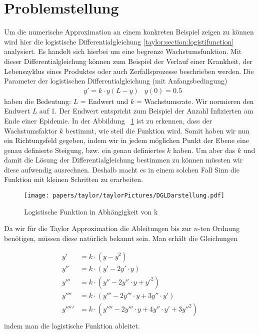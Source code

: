 %
%
%
\section{Problemstellung
\label{taylor:section:problemstellung}}
Um die numerische Approximation an einem konkreten Beispiel zeigen zu können wird hier die logistische Differentialgleichung \eqref{taylor:section:logistifunction} analysiert.
Es handelt sich hierbei um eine begrenze Wachstumsfunktion. 
Mit dieser Differentialgleichung können zum Beispiel der Verlauf einer Krankheit, der Lebenszyklus eines Produktes oder auch Zerfallsprozesse beschrieben werden. Die Parameter der logistischen Differentialgleichung (mit Anfangsbedingung)
\begin{align*}
	&y' = k\cdot y(L-y) 
	&y(0) = 0.5
	\label{taylor:section:logistifunction}
\end{align*}
haben die Bedeutung: $L$ = Endwert und $k$ = Wachstumsrate.
Wir normieren den Endwert $L$ auf 1.
Der Endwert entspricht zum Beispiel der Anzahl Infizierten am Ende einer Epidemie.
In der Abbildung ~\ref{taylor:section:fig:DGLDarstellung} ist zu erkennen, dass der Wachstumsfaktor $k$ bestimmt, wie steil die Funktion wird.
Somit haben wir nun ein Richtungsfeld gegeben, indem wir in jedem möglichen Punkt der Ebene eine genau definierte Steigung, bzw. ein genau definiertes $k$ haben.
Um aber das $k$ und damit die Lösung der Differentialgleichung bestimmen zu können müssten wir diese aufwendig ausrechnen.
Deshalb macht es in einem solchen Fall Sinn die Funktion mit kleinen Schritten zu erarbeiten.

\begin{figure}
	\centering
	\texttt{[image: papers/taylor/taylorPictures/DGLDarstellung.pdf]}
	\caption{Logistische Funktion in Abhängigkeit von k}
	\label{taylor:section:fig:DGLDarstellung}
\end{figure}

Da wir für die Taylor Approximation die Ableitungen bis zur $n$-ten Ordnung benötigen, müssen diese natürlich bekannt sein. Man erhält die Gleichungen

\begin{equation}
	\begin{aligned}
		y'&=k\cdot (y-y^{2})\\
		y''&=k\cdot (y'-2y'\cdot y)\\
		y'''&=k\cdot (y''-2y''\cdot y+y'^{2})\\
		y''''&=k\cdot (y'''-2y'''\cdot y+3y''\cdot y')\\
		y'''''&=k\cdot (y''''-2y'''\cdot y+4y''\cdot y'+3y''^{2})\\
	\end{aligned}
\end{equation}
indem man die logistische Funktion ableitet.


